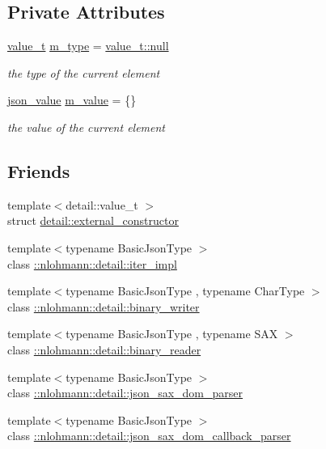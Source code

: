 \subsection*{Private Attributes}
\begin{DoxyCompactItemize}
\item 
\hyperlink{namespacenlohmann_1_1detail_a1ed8fc6239da25abcaf681d30ace4985}{value\+\_\+t} \hyperlink{classnlohmann_1_1basic__json_a91990b60d7d4d67968a2c1db677536e7}{m\+\_\+type} = \hyperlink{namespacenlohmann_1_1detail_a1ed8fc6239da25abcaf681d30ace4985a37a6259cc0c1dae299a7866489dff0bd}{value\+\_\+t\+::null}
\begin{DoxyCompactList}\small\item\em the type of the current element \end{DoxyCompactList}\item 
\hyperlink{unionnlohmann_1_1basic__json_1_1json__value}{json\+\_\+value} \hyperlink{classnlohmann_1_1basic__json_aeb0814f76966f99290cb29e127c90a77}{m\+\_\+value} = \{\}
\begin{DoxyCompactList}\small\item\em the value of the current element \end{DoxyCompactList}\end{DoxyCompactItemize}
\subsection*{Friends}
\begin{DoxyCompactItemize}
\item 
{\footnotesize template$<$detail\+::value\+\_\+t $>$ }\\struct \hyperlink{classnlohmann_1_1basic__json_a6275ed57bae6866cdf5db5370a7ad47c}{detail\+::external\+\_\+constructor}
\item 
{\footnotesize template$<$typename Basic\+Json\+Type $>$ }\\class \hyperlink{classnlohmann_1_1basic__json_a842e5c7ca096025c18b11e715d3401f4}{\+::nlohmann\+::detail\+::iter\+\_\+impl}
\item 
{\footnotesize template$<$typename Basic\+Json\+Type , typename Char\+Type $>$ }\\class \hyperlink{classnlohmann_1_1basic__json_a69d491bbda88ade6d3c7a2b11309e8bf}{\+::nlohmann\+::detail\+::binary\+\_\+writer}
\item 
{\footnotesize template$<$typename Basic\+Json\+Type , typename S\+AX $>$ }\\class \hyperlink{classnlohmann_1_1basic__json_a3226693341c251507fec5d6f4fa5ce79}{\+::nlohmann\+::detail\+::binary\+\_\+reader}
\item 
{\footnotesize template$<$typename Basic\+Json\+Type $>$ }\\class \hyperlink{classnlohmann_1_1basic__json_a47aabb1eceae32e8a6e8e7f0ff34be60}{\+::nlohmann\+::detail\+::json\+\_\+sax\+\_\+dom\+\_\+parser}
\item 
{\footnotesize template$<$typename Basic\+Json\+Type $>$ }\\class \hyperlink{classnlohmann_1_1basic__json_a95574da8d12905ea99dc348934c837da}{\+::nlohmann\+::detail\+::json\+\_\+sax\+\_\+dom\+\_\+callback\+\_\+parser}
\end{DoxyCompactItemize}

